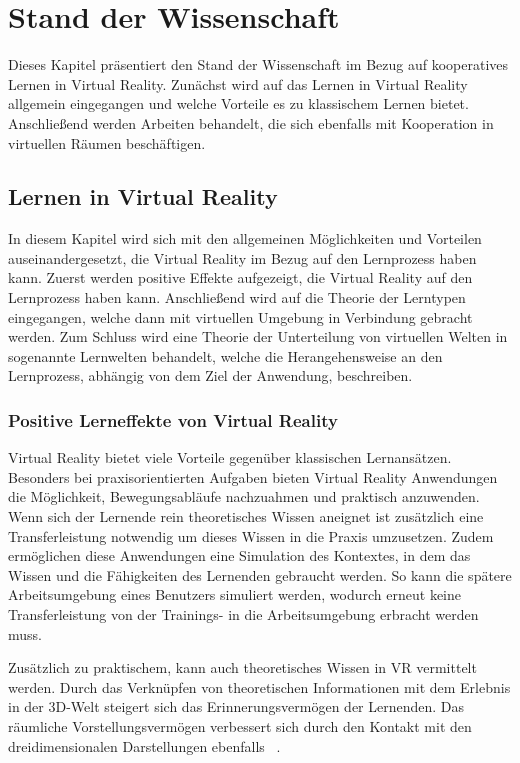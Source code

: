 \section{Stand der Wissenschaft} \label{Wissenschaft}
Dieses Kapitel präsentiert den Stand der Wissenschaft im Bezug auf kooperatives Lernen in Virtual Reality. Zunächst wird auf das Lernen in Virtual Reality allgemein eingegangen und welche Vorteile es zu klassischem Lernen bietet. Anschließend werden Arbeiten behandelt, die sich ebenfalls mit Kooperation in virtuellen Räumen beschäftigen.

\subsection{Lernen in Virtual Reality}
In diesem Kapitel wird sich mit den allgemeinen Möglichkeiten und Vorteilen auseinandergesetzt, die Virtual Reality im Bezug auf den Lernprozess haben kann. Zuerst werden positive Effekte aufgezeigt, die Virtual Reality auf den Lernprozess haben kann. Anschließend wird auf die Theorie der Lerntypen eingegangen, welche dann mit virtuellen Umgebung in Verbindung gebracht werden. Zum Schluss wird eine Theorie der Unterteilung von virtuellen Welten in sogenannte Lernwelten behandelt, welche die Herangehensweise an den Lernprozess, abhängig von dem Ziel der Anwendung, beschreiben.

\subsubsection{Positive Lerneffekte von Virtual Reality}
Virtual Reality bietet viele Vorteile gegenüber klassischen Lernansätzen. Besonders bei praxisorientierten Aufgaben bieten Virtual Reality Anwendungen die Möglichkeit, Bewegungsabläufe nachzuahmen und praktisch anzuwenden. Wenn sich der Lernende rein theoretisches Wissen aneignet ist zusätzlich eine Transferleistung notwendig um dieses Wissen in die Praxis umzusetzen. Zudem ermöglichen diese Anwendungen eine Simulation des Kontextes, in dem das Wissen und die Fähigkeiten des Lernenden gebraucht werden. So kann die spätere Arbeitsumgebung eines Benutzers simuliert werden, wodurch erneut keine Transferleistung von der Trainings- in die Arbeitsumgebung erbracht werden muss.\\
\newpage

Zusätzlich zu praktischem, kann auch theoretisches Wissen in VR vermittelt werden. Durch das Verknüpfen von theoretischen Informationen mit dem Erlebnis in der 3D-Welt steigert sich das Erinnerungsvermögen der Lernenden. Das räumliche Vorstellungsvermögen verbessert sich durch den Kontakt mit den dreidimensionalen Darstellungen ebenfalls ~\parencite{Buehler2020}.\\

